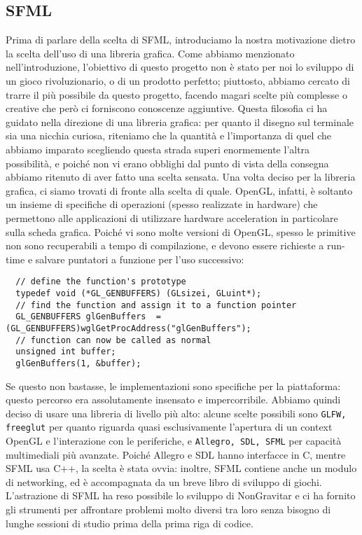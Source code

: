 \documentclass{article}
\begin{document}
\subsection{SFML}
Prima di parlare della scelta di SFML, introduciamo la nostra motivazione dietro la scelta dell'uso di una libreria grafica. Come abbiamo menzionato nell'introduzione, l'obiettivo di questo progetto non è stato per noi lo sviluppo di un gioco rivoluzionario, o di un prodotto perfetto; piuttosto, abbiamo cercato di trarre il più possibile da questo progetto, facendo magari scelte più complesse o creative che però ci forniscono conoscenze aggiuntive. Questa filosofia ci ha guidato nella direzione di una libreria grafica: per quanto il disegno sul terminale sia una nicchia curiosa, riteniamo che la quantità e l'importanza di quel che abbiamo imparato scegliendo questa strada superi enormemente l'altra possibilità, e poiché non vi erano obblighi dal punto di vista della consegna abbiamo ritenuto di aver fatto una scelta sensata. \medskip \newline
Una volta deciso per la libreria grafica, ci siamo trovati di fronte alla scelta di quale. OpenGL, infatti, è soltanto un insieme di specifiche di operazioni (spesso realizzate in hardware) che permettono alle applicazioni di utilizzare hardware acceleration in particolare sulla scheda grafica. Poiché vi sono molte versioni di OpenGL, spesso le primitive non sono recuperabili a tempo di compilazione, e devono essere richieste a run-time e salvare puntatori a funzione per l'uso successivo:
\begin{lstlisting}
  // define the function's prototype
  typedef void (*GL_GENBUFFERS) (GLsizei, GLuint*);
  // find the function and assign it to a function pointer
  GL_GENBUFFERS glGenBuffers  = (GL_GENBUFFERS)wglGetProcAddress("glGenBuffers");
  // function can now be called as normal
  unsigned int buffer;
  glGenBuffers(1, &buffer);
\end{lstlisting} 
\smallskip
Se questo non bastasse, le implementazioni sono specifiche per la piattaforma: questo percorso era assolutamente insensato e impercorribile. \medskip \newline
Abbiamo quindi deciso di usare una libreria di livello più alto: alcune scelte possibili sono \lstinline{GLFW, freeglut} per quanto riguarda quasi esclusivamente l'apertura di un context OpenGL e l'interazione con le periferiche, e \lstinline{Allegro, SDL, SFML} per capacità multimediali più avanzate. Poiché Allegro e SDL hanno interfacce in C, mentre SFML usa C++, la scelta è stata ovvia: inoltre, SFML contiene anche un modulo di networking, ed è accompagnata da un breve libro di sviluppo di giochi. L'astrazione di SFML ha reso possibile lo sviluppo di NonGravitar e ci ha fornito gli strumenti per affrontare problemi molto diversi tra loro senza bisogno di lunghe sessioni di studio prima della prima riga di codice.
\end{document}
